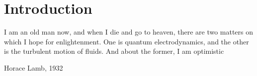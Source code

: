 		\setcounter{secnumdepth}{0}
\chapter*{Introduction}

\epigraph{ I am an old man now, and when I die and go to heaven, there are two matters on which I hope for enlightenment. One is quantum electrodynamics, and the other is the turbulent motion of fluids. And about the former, I am optimistic}{Horace Lamb, 1932}
	
